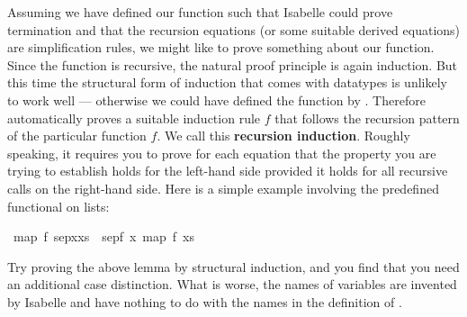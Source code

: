 %
\begin{isabellebody}%
\def\isabellecontext{Induction}%
\isamarkupfalse%
%
\begin{isamarkuptext}%
Assuming we have defined our function such that Isabelle could prove
termination and that the recursion equations (or some suitable derived
equations) are simplification rules, we might like to prove something about
our function. Since the function is recursive, the natural proof principle is
again induction. But this time the structural form of induction that comes
with datatypes is unlikely to work well --- otherwise we could have defined the
function by . Therefore  automatically
proves a suitable induction rule $f$ that follows the
recursion pattern of the particular function $f$. We call this
\textbf{recursion induction}. Roughly speaking, it
requires you to prove for each  equation that the property
you are trying to establish holds for the left-hand side provided it holds
for all recursive calls on the right-hand side. Here is a simple example
involving the predefined  functional on lists:%
\end{isamarkuptext}%
\isamarkuptrue%
\ {\isachardoublequote}map\ f\ {\isacharparenleft}sep{\isacharparenleft}x{\isacharcomma}xs{\isacharparenright}{\isacharparenright}\ {\isacharequal}\ sep{\isacharparenleft}f\ x{\isacharcomma}\ map\ f\ xs{\isacharparenright}{\isachardoublequote}\isamarkupfalse%
\isamarkuptrue%
\isamarkupfalse%
\isamarkuptrue%
\isamarkupfalse%
\isamarkupfalse%
%
\begin{isamarkuptext}%
Try proving the above lemma by structural induction, and you find that you
need an additional case distinction. What is worse, the names of variables
are invented by Isabelle and have nothing to do with the names in the
definition of .


\end{isamarkuptext}
\end{isabellebody}
